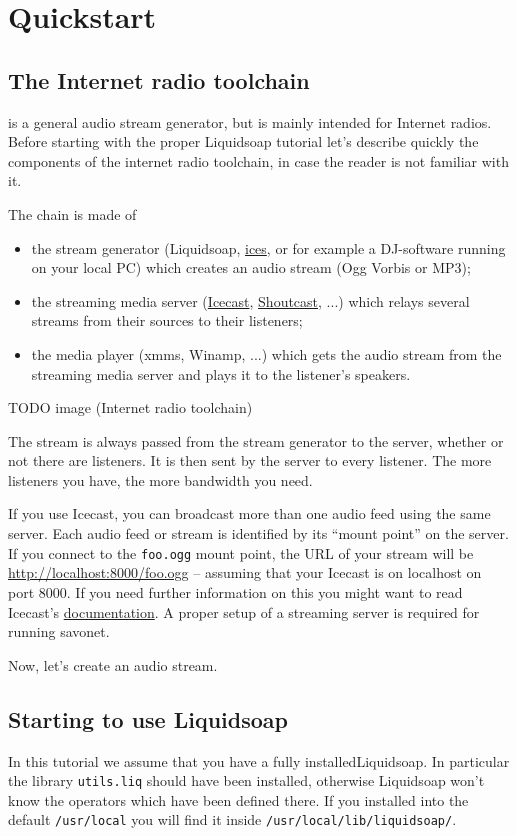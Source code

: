\chapter{Quickstart}
\section{The Internet radio toolchain}
\Liquidsoap is a general audio stream generator, but is mainly intended for
Internet radios. Before starting with the proper Liquidsoap tutorial let's
describe quickly the components of the internet radio toolchain, in case the
reader is not familiar with it.

The chain is made of
\begin{itemize}
\item the stream generator (Liquidsoap,
  \href{http://www.icecast.org/ices.php}{ices}, or for example a DJ-software
  running on your local PC) which creates an audio stream (Ogg Vorbis or MP3);
\item the streaming media server (\href{http://www.icecast.org}{Icecast},
  \href{http://www.shoutcast.com}{Shoutcast}, ...) which relays several streams
  from their sources to their listeners;
\item the media player (xmms, Winamp, ...) which gets the audio stream from the
  streaming media server and plays it to the listener's speakers.
\end{itemize}

TODO image (Internet radio toolchain)

The stream is always passed from the stream generator to the server, whether or
not there are listeners. It is then sent by the server to every listener. The
more listeners you have, the more bandwidth you need.

If you use Icecast, you can broadcast more than one audio feed using the same
server. Each audio feed or stream is identified by its ``mount point'' on the
server. If you connect to the \verb+foo.ogg+ mount point, the URL of your stream
will be \href{http://localhost:8000/foo.ogg}{http://localhost:8000/foo.ogg} --
assuming that your Icecast is on localhost on port 8000. If you need further
information on this you might want to read Icecast's
\href{http://www.icecast.org}{documentation}. A proper setup of a streaming
server is required for running savonet.

Now, let's create an audio stream.

\section{Starting to use Liquidsoap}
In this tutorial we assume that you have a fully installedLiquidsoap. In
particular the library \verb+utils.liq+ should have been installed, otherwise
Liquidsoap won't know the operators which have been defined there. If you
installed into the default \verb+/usr/local+ you will find it inside
\verb+/usr/local/lib/liquidsoap/+.

